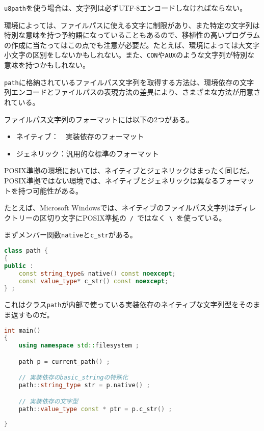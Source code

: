 \lstinline!u8path!を使う場合は、文字列は必ずUTF-8エンコードしなければならない。

環境によっては、ファイルパスに使える文字に制限があり、また特定の文字列は特別な意味を持つ予約語になっていることもあるので、移植性の高いプログラムの作成に当たってはこの点でも注意が必要だ。たとえば、環境によっては大文字小文字の区別をしないかもしれない。また、\lstinline!CON!や\lstinline!AUX!のような文字列が特別な意味を持つかもしれない。

\lstinline!path!に格納されているファイルパス文字列を取得する方法は、環境依存の文字列エンコードとファイルパスの表現方法の差異により、さまざまな方法が用意されている。

ファイルパス文字列のフォーマットには以下の2つがある。

\begin{itemize}
\itemsep1pt\parskip0pt
\item
  ネイティブ：　実装依存のフォーマット
\item
  ジェネリック：汎用的な標準のフォーマット
\end{itemize}

POSIX準拠の環境においては、ネイティブとジェネリックはまったく同じだ。POSIX準拠ではない環境では、ネイティブとジェネリックは異なるフォーマットを持つ可能性がある。

たとえば、Microsoft
Windowsでは、ネイティブのファイルパス文字列はディレクトリーの区切り文字にPOSIX準拠の~\lstinline!/!~ではなく~\lstinline!\!~を使っている。

まずメンバー関数\lstinline!native!と\lstinline!c_str!がある。

\begin{lstlisting}[language=C++]
class path {
{
public :
    const string_type& native() const noexcept;
    const value_type* c_str() const noexcept;
} ;
\end{lstlisting}

これはクラス\lstinline!path!が内部で使っている実装依存のネイティブな文字列型をそのまま返すものだ。

\begin{lstlisting}[language=C++]
int main()
{
    using namespace std::filesystem ;

    path p = current_path() ;

    // 実装依存のbasic_stringの特殊化
    path::string_type str = p.native() ;

    // 実装依存の文字型
    path::value_type const * ptr = p.c_str() ;
    
}
\end{lstlisting}

